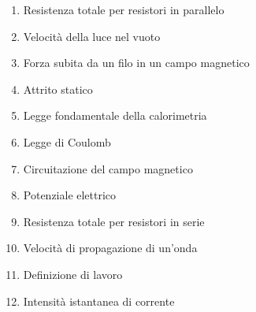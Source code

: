 \documentclass[a4paper,11pt,italian]{article}
\begin{document}
\begin{enumerate}
\item Resistenza totale per resistori in parallelo
\item Velocità della luce nel vuoto
\item Forza subita da un filo in un campo magnetico
\item Attrito statico
\item Legge fondamentale della calorimetria
\item Legge di Coulomb
\item Circuitazione del campo magnetico
\item Potenziale elettrico
\item Resistenza totale per resistori in serie
\item Velocità di propagazione di un'onda
\item Definizione di lavoro
\item Intensità istantanea di corrente
\end{enumerate}
\end{document}
